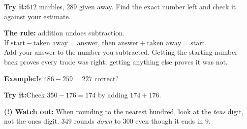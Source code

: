 \documentclass[12pt]{article}
\begin{document}
\begin{tryitbox}
\textbf{Try it:}\quad $612$ marbles, $289$ given away. Find the exact number
left and check it against your estimate.\\[2pt]
\end{tryitbox}


\begin{formulabox}
\textbf{The rule:} addition undoes subtraction.\\[3pt]
If $\text{start} - \text{taken away} = \text{answer}$, then
$\text{answer} + \text{taken away} = \text{start}$.\\[3pt]
Add your answer to the number you subtracted. Getting the starting number back
proves every trade was right; getting anything else proves it was not.
\end{formulabox}

\begin{examplebox}
\textbf{Example:}\quad Is $486 - 259 = 227$ correct?
\end{examplebox}

\begin{tryitbox}
\textbf{Try it:}\quad Check $350 - 176 = 174$ by adding $174 + 176$.\\[2pt]
\end{tryitbox}

\begin{watchoutbox}
\textbf{(!) Watch out:} When rounding to the nearest hundred, look at the
\emph{tens} digit, not the ones digit. $349$ rounds \emph{down} to $300$ even
though it ends in $9$.
\end{watchoutbox}
\end{document}
